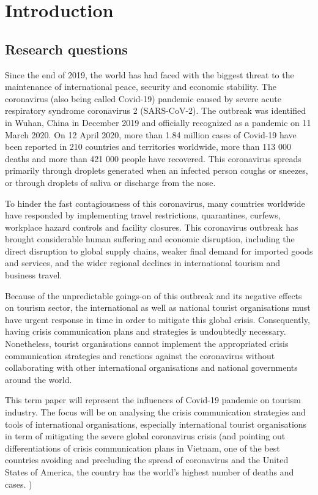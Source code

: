 \documentclass[draft=false
              ,paper=a4
              ,twoside=false
              ,fontsize=12pt
              ,headsepline
              ,BCOR10mm
              ,DIV11
              ]{scrbook}
\begin{document}
\frontmatter



\tableofcontents

\mainmatter
\chapter{Introduction}
\section{Research questions}

Since the end of 2019, the world has had faced with the biggest threat to the maintenance of international peace, security and economic stability. The coronavirus (also being called Covid-19) pandemic caused by severe acute respiratory syndrome coronavirus 2 (SARS-CoV-2). The outbreak was identified in Wuhan, China in December 2019 and officially recognized as a pandemic on 11 March 2020. On 12 April 2020, more than 1.84 million cases of Covid-19 have been reported in 210 countries and territories worldwide, more than 113 000 deaths and more than 421 000 people have recovered. This coronavirus spreads primarily through droplets generated when an infected person coughs or sneezes, or through droplets of saliva or discharge from the nose. 

To hinder the fast contagiousness of this coronavirus, many countries worldwide have responded by implementing travel restrictions, quarantines, curfews, workplace hazard controls and facility closures. This coronavirus outbreak has brought considerable human suffering and economic disruption, including the direct disruption to global supply chains, weaker final demand for imported goods and services, and the wider regional declines in international tourism and business travel. 

Because of the unpredictable goings-on of this outbreak and its negative effects on tourism sector, the international as well as national tourist organisations must have urgent response in time in order to mitigate this global crisis. Consequently, having crisis communication plans and strategies is undoubtedly necessary. Nonetheless, tourist organisations cannot implement the appropriated crisis communication strategies and reactions against the coronavirus without collaborating with other international organisations and national governments around the world.

This term paper will represent the influences of Covid-19 pandemic on tourism industry. The focus will be on analysing the crisis communication strategies and tools of international organisations, especially international tourist organisations in term of mitigating the severe global coronavirus crisis (and pointing out differentiations of crisis communication plans in Vietnam, one of the best countries avoiding and precluding the spread of coronavirus and the United States of America, the country has the world’s highest number of deaths and cases. )
\end{document}
